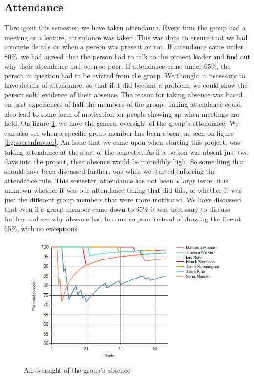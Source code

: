 \documentclass{article}
\begin{document}
\subsection{Attendance}
Througout this semester, we have taken attendance. 
Every time the group had a meeting or a lecture, attendance was taken. 
This was done to ensure that we had concrete details on when a person was present or not. 
If attendance came under 80\%, we had agreed that the person had to talk to the project leader and find out why their attendance had been so poor. 
If attendance came under 65\%, the person in question had to be evicted from the group. 
We thought it necessary to have details of attendance, so that if it did become a problem, we could show the person solid evidence of their absence. 
The reason for taking absence was based on past experiences of half the members of the group. 
Taking attendance could also lead to some form of motivation for people showing up when meetings are held.
On figure \ref{fig:GraphImage}, we have the general oversight of the group's attendance. We can also see when a specific group member has been absent as seen on figure \ref{fig:soerenfravaer}.
An issue that we came upon when starting this project, was taking attendance at the start of the semester. 
As if a person was absent just two days into the project, their absence would be incredibly high. 
So something that should have been discussed further, was when we started enforcing the attendance rule. 
This semester, attendance has not been a large issue. 
It is unknown whether it was our attendance taking that did this, or whether it was just the different group members that were more motivated.
We have discussed that even if a group member came down to 65\% it was necessary to discuss further and see why absence had become so poor instead of drawing the line at 65\%, with no exceptions.

\begin{figure}
	\centering
	\includegraphics[width=1\textwidth]{figures/GraphImage.png}
	\caption{An oversight of the group's absence}
	\label{fig:GraphImage}
\end{figure}
\end{document}
